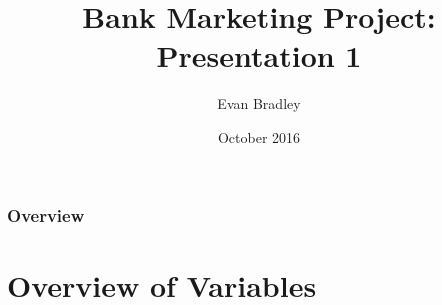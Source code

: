 \documentclass{beamer}
\title[Bank Marketing Project]{Bank Marketing Project: Presentation 1} %
\author{Evan Bradley} %
\institute[OU] %
{
Oakland University \\ %
\medskip
\textit{edbradley@oakland.edu} %
}
\date{October 2016} %
\begin{document}
\begin{frame}
	\frametitle{\space}
	\titlepage %
\end{frame}

\begin{frame}
\frametitle{Overview} %
\tableofcontents %
\end{frame}


\section{Overview of Variables} %


\end{document}

